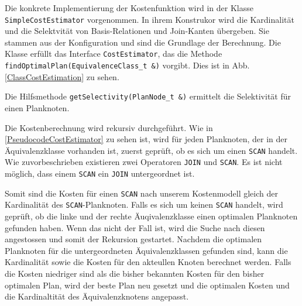 Die konkrete Implementierung der Kostenfunktion wird in der Klasse \texttt{Simple\-Cost\-Estimator} vorgenommen. In ihrem Konstrukor wird die Kardinalität und die Selektvität von Basis-Relationen und Join-Kanten übergeben. Sie stammen aus der Konfiguration und sind die Grundlage der Berechnung. Die Klasse erfüllt das Interface \texttt{Cost\-Estimator}, das die Methode \texttt{find\-Optimal\-Plan(Equivalence\-Class\_t \&)} vorgibt. Dies ist in Abb. \ref{ClassCostEstimation} zu sehen.

Die Hilfsmethode  \texttt{get\-Selectivity(Plan\-Node\_t \&)} ermittelt die Selektivität für einen Planknoten.


Die Kostenberechnung wird rekursiv durchgeführt. Wie in \ref{PseudocodeCostEstimator} zu sehen ist, wird für jeden Planknoten, der in der Äquivalenzklasse vorhanden ist, zuerst geprüft, ob es sich um einen \texttt{SCAN} handelt. Wie zuvorbeschrieben existieren zwei Operatoren \texttt{JOIN} und \texttt{SCAN}. Es ist nicht möglich, dass einem \texttt{SCAN} ein \texttt{JOIN} untergeordnet ist. 

Somit sind die Kosten für einen \texttt{SCAN} nach unserem Kostenmodell gleich der Kardinalität des \texttt{SCAN}-Planknoten. Falls es sich um keinen \texttt{SCAN} handelt, wird geprüft, ob die linke und der rechte Äuqivalenzklasse einen optimalen Planknoten gefunden haben. Wenn das nicht der Fall ist, wird die Suche nach diesen angestossen und somit der Rekursion gestartet. Nachdem die optimalen Planknoten für die untergeordneten Äquivalenzklassen gefunden sind, kann die Kardinalität sowie die Kosten für den akteullen Knoten berechnet werden. Falls die Kosten niedriger sind als die bisher bekannten Kosten für den bisher optimalen Plan, wird der beste Plan neu gesetzt und die optimalen Kosten und die Kardinaltität des Äquivalenzknotens angepasst.



